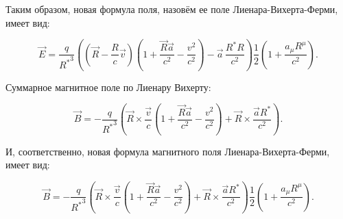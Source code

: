\documentclass[12pt]{article}
\begin{document}
Таким образом, новая формула поля, назовём ее поле Лиенара-Вихерта-Ферми, имеет вид:

$$\vec{E} = \frac{q}{{{R}^{*}}^{3}}\left( \left(\vec{R}-\frac{R}{c}\vec{v} \right) \left(1 + \frac{\vec{R}\vec{a}}{c^2} - \frac{v^2}{c^2} \right) - \vec{a}\,\frac{{R}^{*}R}{c^2} \right) \frac{1}{2} \left(1 + \frac{a_{\mu} R^{\mu}}{c^2}\right).$$


Суммарное магнитное поле по Лиенару Вихерту:

$$\vec{B} = -\frac{q}{{{R}^{*}}^3}\left(\vec{R}\times\frac{\vec{v}}{c}\left(1 + \frac{\vec{R}\vec{a}}{c^2} - \frac{v^2}{c^2}\right) + \vec{R}\times\frac{\vec{a}{{R}^{*}}}{c^2}\right).$$

И, соответственно, новая формула магнитного поля Лиенара-Вихерта-Ферми, имеет вид:

$$\vec{B} = -\frac{q}{{{R}^{*}}^3}\left(\vec{R}\times\frac{\vec{v}}{c}\left(1 + \frac{\vec{R}\vec{a}}{c^2} - \frac{v^2}{c^2}\right) + \vec{R}\times\frac{\vec{a}{{R}^{*}}}{c^2}\right) \frac{1}{2} \left(1 + \frac{a_{\mu} R^{\mu}}{c^2}\right).$$
\end{document}
